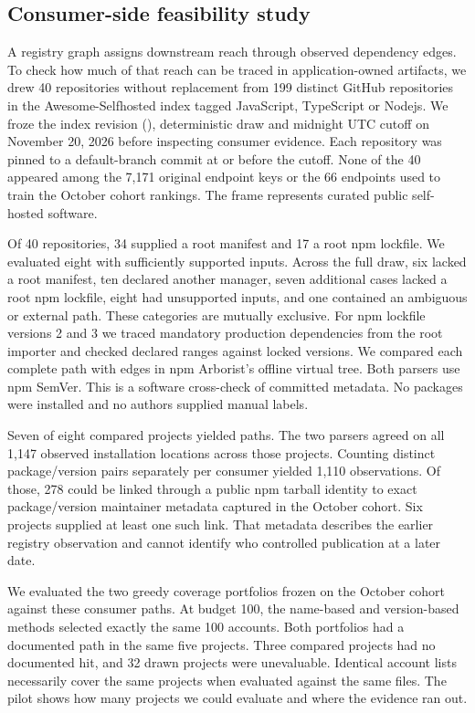 \subsection{Consumer-side feasibility study}
A registry graph assigns downstream reach through observed dependency edges. To check how much of that reach can be traced in application-owned artifacts, we drew 40 repositories without replacement from 199 distinct GitHub repositories in the Awesome-Selfhosted index tagged JavaScript, TypeScript or Nodejs. We froze the index revision (), deterministic draw and midnight UTC cutoff on November 20, 2026 before inspecting consumer evidence. Each repository was pinned to a default-branch commit at or before the cutoff. None of the 40 appeared among the 7,171 original endpoint keys or the 66 endpoints used to train the October cohort rankings. The frame represents curated public self-hosted software.

Of 40 repositories, 34 supplied a root manifest and 17 a root npm lockfile. We evaluated eight with sufficiently supported inputs. Across the full draw, six lacked a root manifest, ten declared another manager, seven additional cases lacked a root npm lockfile, eight had unsupported inputs, and one contained an ambiguous or external path. These categories are mutually exclusive. For npm lockfile versions 2 and 3 we traced mandatory production dependencies from the root importer and checked declared ranges against locked versions. We compared each complete path with edges in npm Arborist's offline virtual tree. Both parsers use npm SemVer. This is a software cross-check of committed metadata. No packages were installed and no authors supplied manual labels.

Seven of eight compared projects yielded paths. The two parsers agreed on all 1,147 observed installation locations across those projects. Counting distinct package/version pairs separately per consumer yielded 1,110 observations. Of those, 278 could be linked through a public npm tarball identity to exact package/version maintainer metadata captured in the October cohort. Six projects supplied at least one such link. That metadata describes the earlier registry observation and cannot identify who controlled publication at a later date.

We evaluated the two greedy coverage portfolios frozen on the October cohort against these consumer paths. At budget 100, the name-based and version-based methods selected exactly the same 100 accounts. Both portfolios had a documented path in the same five projects. Three compared projects had no documented hit, and 32 drawn projects were unevaluable. Identical account lists necessarily cover the same projects when evaluated against the same files. The pilot shows how many projects we could evaluate and where the evidence ran out.
